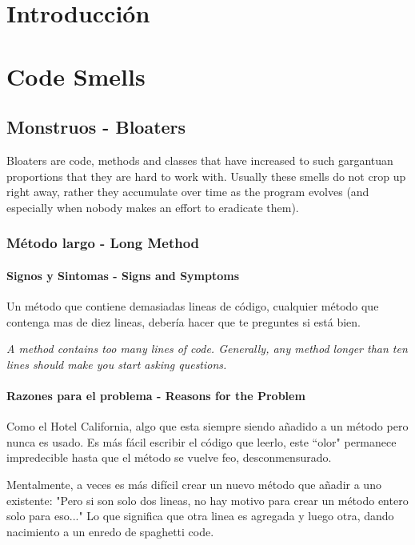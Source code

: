 \documentclass[11pt,a4paper,oneside]{book}
\begin{document}
 
\chapter{Introducción}

\chapter{Code Smells}

\section{Monstruos - Bloaters}

Bloaters are code, methods and classes that have increased to such gargantuan proportions that they are hard to work with. Usually these smells do not crop up right away, rather they accumulate over time as the program evolves (and especially when nobody makes an effort to eradicate them).
\label{metodolargo}
\subsection{Método largo -   Long Method}
\subsubsection{Signos y Sintomas - Signs and Symptoms}

Un método que contiene demasiadas lineas de código, cualquier método que contenga mas de diez lineas, debería hacer que te preguntes si está bien.

\textit{A method contains too many lines of code. Generally, any method longer than ten lines should make you start asking questions.}

\subsubsection{Razones para el problema - Reasons for the Problem}

Como el Hotel California, algo que esta siempre siendo añadido a un método pero nunca es usado. Es más fácil escribir el código que leerlo, este ``olor" permanece impredecible hasta que el método se vuelve feo, desconmensurado. 

Mentalmente, a veces es más difícil crear un nuevo método que añadir a uno existente: "Pero si son solo dos lineas, no hay motivo para crear un método entero solo para eso..." Lo que significa que otra linea es agregada y luego otra, dando nacimiento a un enredo de spaghetti code. 
\end{document}
